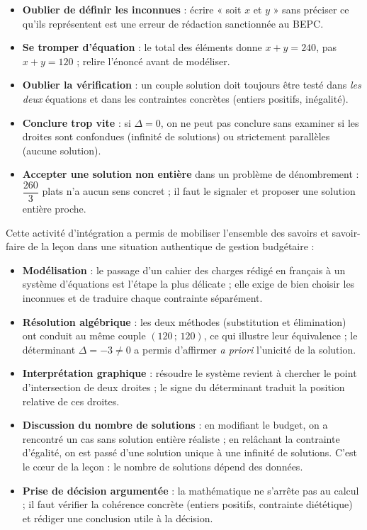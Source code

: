 \documentclass[11pt]{article}
\newcounter{popsec}
\newcounter{popsub}
\newcommand{\courssub}[1]{%
  \stepcounter{popsub}%
  \par\vspace{9pt}\noindent{\popxbold\fontsize{11.5}{13}\selectfont\color{popink}{\color{poporange}\thepopsec.\thepopsub}\hspace{6pt}#1}\par\nopagebreak\vspace{4pt}
}
\begin{document}
\begin{attention}
\begin{itemize}
\item \textbf{Oublier de définir les inconnues} : écrire « soit $x$ et $y$ » sans préciser ce qu'ils représentent est une erreur de rédaction sanctionnée au BEPC.
\item \textbf{Se tromper d'équation} : le total des éléments donne $x + y = 240$, pas $x + y = 120$ ; relire l'énoncé avant de modéliser.
\item \textbf{Oublier la vérification} : un couple solution doit toujours être testé dans \emph{les deux} équations et dans les contraintes concrètes (entiers positifs, inégalité).
\item \textbf{Conclure trop vite} : si $\Delta = 0$, on ne peut pas conclure sans examiner si les droites sont confondues (infinité de solutions) ou strictement parallèles (aucune solution).
\item \textbf{Accepter une solution non entière} dans un problème de dénombrement : $\dfrac{260}{3}$ plats n'a aucun sens concret ; il faut le signaler et proposer une solution entière proche.
\end{itemize}
\end{attention}

\courssub{Bilan de l'activité}

Cette activité d'intégration a permis de mobiliser l'ensemble des savoirs et savoir-faire de la leçon dans une situation authentique de gestion budgétaire :

\begin{itemize}
\item \textbf{Modélisation} : le passage d'un cahier des charges rédigé en français à un système d'équations est l'étape la plus délicate ; elle exige de bien choisir les inconnues et de traduire chaque contrainte séparément.
\item \textbf{Résolution algébrique} : les deux méthodes (substitution et élimination) ont conduit au même couple $(120\,;\,120)$, ce qui illustre leur équivalence ; le déterminant $\Delta = -3 \neq 0$ a permis d'affirmer \emph{a priori} l'unicité de la solution.
\item \textbf{Interprétation graphique} : résoudre le système revient à chercher le point d'intersection de deux droites ; le signe du déterminant traduit la position relative de ces droites.
\item \textbf{Discussion du nombre de solutions} : en modifiant le budget, on a rencontré un cas sans solution entière réaliste ; en relâchant la contrainte d'égalité, on est passé d'une solution unique à une infinité de solutions. C'est le cœur de la leçon : le nombre de solutions dépend des données.
\item \textbf{Prise de décision argumentée} : la mathématique ne s'arrête pas au calcul ; il faut vérifier la cohérence concrète (entiers positifs, contrainte diététique) et rédiger une conclusion utile à la décision.
\end{itemize}
\end{document}
